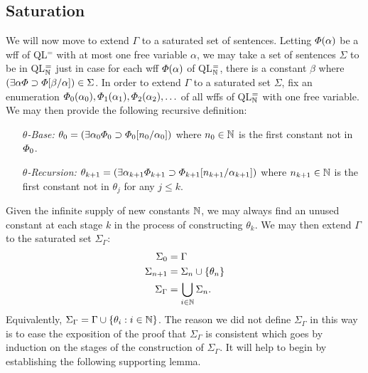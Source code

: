 \subsection{Saturation}%
  \label{sub:Saturation}

We will now move to extend $\Gamma$ to a saturated set of sentences.
Letting $\varPhi(\alpha)$ be a wff of QL$^=$ with at most one free variable $\alpha$, we may take a set of sentences $\Sigma$ to be  in QL$^=_{\mathbb{N}}$ just in case for each wff $\varPhi(\alpha)$ of QL$^=_{\mathbb{N}}$, there is a constant $\beta$ where $(\exists \alpha\varPhi \supset \varPhi[\beta/\alpha])\in\Sigma$.
In order to extend $\Gamma$ to a saturated set $\Sigma$, fix an enumeration $\varPhi_0(\alpha_0),\varPhi_1(\alpha_1),\varPhi_2(\alpha_2),\ldots$ of all wffs of QL$^=_{\mathbb{N}}$ with one free variable. %
We may then provide the following recursive definition:
\begin{enumerate}[leftmargin=1in]
  \item[\it $\theta$-Base:] $\theta_0=(\exists \alpha_0\varPhi_0\supset \varPhi_0[n_0/\alpha_0])$ where $n_0\in\mathbb{N}$ is the first constant not in $\varPhi_0$.
  \item[\it $\theta$-Recursion:] $\theta_{k+1}=(\exists \alpha_{k+1}\varPhi_{k+1}\supset \varPhi_{k+1}[n_{k+1}/\alpha_{k+1}])$  where $n_{k+1}\in\mathbb{N}$ is the first constant not in $\theta_j$ for any $j\leq k$.
\end{enumerate}
Given the infinite supply of new constants $\mathbb{N}$, we may always find an unused constant at each stage $k$ in the process of constructing $\theta_k$.
We may then extend $\Gamma$ to the saturated set $\Sigma_\Gamma$:
\begin{align*}
  \label{name}
  \Sigma_0     &= \Gamma\\
  \Sigma_{n+1} &= \Sigma_n\cup\lbrace\theta_n\rbrace\\
  \Sigma_\Gamma &= \bigcup_{i\in\mathbb{N}}\Sigma_n.
\end{align*}
Equivalently, $\Sigma_\Gamma=\Gamma\cup\lbrace\theta_i:i\in\mathbb{N}\rbrace$.
The reason we did not define $\Sigma_\Gamma$ in this way is to ease the exposition of the proof that $\Sigma_\Gamma$ is consistent which goes by induction on the stages of the construction of $\Sigma_\Gamma$. 
It will help to begin by establishing the following supporting lemma.





